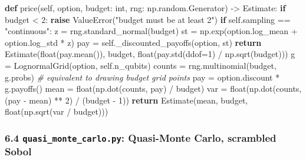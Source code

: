 \documentclass[
  10pt,
]{article}
\newenvironment{Shaded}{}{}
\newcommand{\BuiltInTok}[1]{\textcolor[rgb]{0.00,0.50,0.00}{#1}}
\newcommand{\CommentTok}[1]{\textcolor[rgb]{0.38,0.63,0.69}{\textit{#1}}}
\newcommand{\ControlFlowTok}[1]{\textcolor[rgb]{0.00,0.44,0.13}{\textbf{#1}}}
\newcommand{\DecValTok}[1]{\textcolor[rgb]{0.25,0.63,0.44}{#1}}
\newcommand{\KeywordTok}[1]{\textcolor[rgb]{0.00,0.44,0.13}{\textbf{#1}}}
\newcommand{\NormalTok}[1]{#1}
\newcommand{\OperatorTok}[1]{\textcolor[rgb]{0.40,0.40,0.40}{#1}}
\newcommand{\PreprocessorTok}[1]{\textcolor[rgb]{0.74,0.48,0.00}{#1}}
\newcommand{\StringTok}[1]{\textcolor[rgb]{0.25,0.44,0.63}{#1}}
\newcommand{\VariableTok}[1]{\textcolor[rgb]{0.10,0.09,0.49}{#1}}
\begin{document}
\begin{Shaded}
\begin{Highlighting}[]
    \KeywordTok{def}\NormalTok{ price(}\VariableTok{self}\NormalTok{, option, budget: }\BuiltInTok{int}\NormalTok{, rng: np.random.Generator) }\OperatorTok{{-}\textgreater{}}\NormalTok{ Estimate:}
        \ControlFlowTok{if}\NormalTok{ budget }\OperatorTok{\textless{}} \DecValTok{2}\NormalTok{:}
            \ControlFlowTok{raise} \PreprocessorTok{ValueError}\NormalTok{(}\StringTok{"budget must be at least 2"}\NormalTok{)}
        \ControlFlowTok{if} \VariableTok{self}\NormalTok{.sampling }\OperatorTok{==} \StringTok{"continuous"}\NormalTok{:}
\NormalTok{            z }\OperatorTok{=}\NormalTok{ rng.standard\_normal(budget)}
\NormalTok{            st }\OperatorTok{=}\NormalTok{ np.exp(option.log\_mean }\OperatorTok{+}\NormalTok{ option.log\_std }\OperatorTok{*}\NormalTok{ z)}
\NormalTok{            pay }\OperatorTok{=} \VariableTok{self}\NormalTok{.\_discounted\_payoffs(option, st)}
            \ControlFlowTok{return}\NormalTok{ Estimate(}\BuiltInTok{float}\NormalTok{(pay.mean()), budget, }\BuiltInTok{float}\NormalTok{(pay.std(ddof}\OperatorTok{=}\DecValTok{1}\NormalTok{) }\OperatorTok{/}\NormalTok{ np.sqrt(budget)))}
\NormalTok{        g }\OperatorTok{=}\NormalTok{ LognormalGrid(option, }\VariableTok{self}\NormalTok{.n\_qubits)}
\NormalTok{        counts }\OperatorTok{=}\NormalTok{ rng.multinomial(budget, g.probs)             }\CommentTok{\# equivalent to drawing \textasciigrave{}budget\textasciigrave{} grid points}
\NormalTok{        pay }\OperatorTok{=}\NormalTok{ option.discount }\OperatorTok{*}\NormalTok{ g.payoffs()}
\NormalTok{        mean }\OperatorTok{=} \BuiltInTok{float}\NormalTok{(np.dot(counts, pay) }\OperatorTok{/}\NormalTok{ budget)}
\NormalTok{        var }\OperatorTok{=} \BuiltInTok{float}\NormalTok{(np.dot(counts, (pay }\OperatorTok{{-}}\NormalTok{ mean) }\OperatorTok{**} \DecValTok{2}\NormalTok{) }\OperatorTok{/}\NormalTok{ (budget }\OperatorTok{{-}} \DecValTok{1}\NormalTok{))}
        \ControlFlowTok{return}\NormalTok{ Estimate(mean, budget, }\BuiltInTok{float}\NormalTok{(np.sqrt(var }\OperatorTok{/}\NormalTok{ budget)))}
\end{Highlighting}
\end{Shaded}

\hypertarget{64-quasi_monte_carlopy-quasi-monte-carlo-scrambled-sobol}{%
\subsubsection{\texorpdfstring{6.4 \texttt{quasi\_monte\_carlo.py}:
Quasi-Monte Carlo, scrambled
Sobol}{6.4 quasi\_monte\_carlo.py: Quasi-Monte Carlo, scrambled Sobol}}\label{64-quasi_monte_carlopy-quasi-monte-carlo-scrambled-sobol}}
\end{document}
